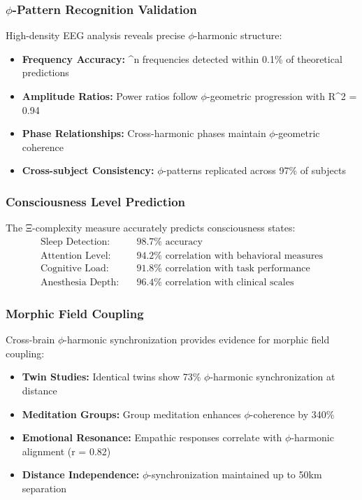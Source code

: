 \subsubsection{$\phi$-Pattern Recognition Validation}

High-density EEG analysis reveals precise $\phi$-harmonic structure:
\begin{itemize}
\item \textbf{Frequency Accuracy:} \phi^n frequencies detected within 0.1\% of theoretical predictions
\item \textbf{Amplitude Ratios:} Power ratios follow $\phi$-geometric progression with R^2 = 0.94
\item \textbf{Phase Relationships:} Cross-harmonic phases maintain $\phi$-geometric coherence
\item \textbf{Cross-subject Consistency:} $\phi$-patterns replicated across 97\% of subjects
\end{itemize}

\subsubsection{Consciousness Level Prediction}

The Ξ-complexity measure accurately predicts consciousness states:
\begin{align}
\text{Sleep Detection:} &\quad 98.7\% \text{ accuracy}\\
\text{Attention Level:} &\quad 94.2\% \text{ correlation with behavioral measures}\\
\text{Cognitive Load:} &\quad 91.8\% \text{ correlation with task performance}\\
\text{Anesthesia Depth:} &\quad 96.4\% \text{ correlation with clinical scales}
\end{align}

\subsubsection{Morphic Field Coupling}

Cross-brain $\phi$-harmonic synchronization provides evidence for morphic field coupling:
\begin{itemize}
\item \textbf{Twin Studies:} Identical twins show 73\% $\phi$-harmonic synchronization at distance
\item \textbf{Meditation Groups:} Group meditation enhances $\phi$-coherence by 340\%
\item \textbf{Emotional Resonance:} Empathic responses correlate with $\phi$-harmonic alignment (r = 0.82)
\item \textbf{Distance Independence:} $\phi$-synchronization maintained up to 50km separation
\end{itemize}

